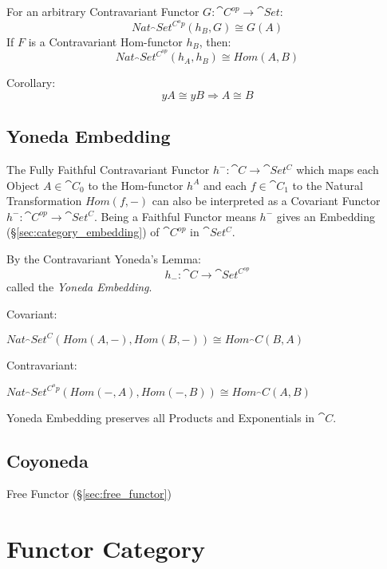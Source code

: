 For an arbitrary Contravariant Functor $G : \cat{C}^{op} \rightarrow
\cat{Set}$:
\[
  Nat_\cat{Set^{C^op}}(h_B,G) \cong G(A)
\]
If $F$ is a Contravariant Hom-functor $h_B$, then:
\[
  Nat_\cat{Set^{C^{op}}}(h_A,h_B) \cong Hom(A,B)
\]

Corollary:
\[
  yA \cong yB \Rightarrow A \cong B
\]



\subsection{Yoneda Embedding}\label{sec:yoneda_embedding}

The Fully Faithful Contravariant Functor $h^- : \cat{C} \rightarrow
\cat{Set^C}$ which maps each Object $A \in \cat{C}_0$ to the
Hom-functor $h^A$ and each $f \in \cat{C}_1$ to the Natural
Transformation $Hom(f,-)$ can also be interpreted as a Covariant
Functor $h^- : \cat{C^{op}} \rightarrow \cat{Set^C}$. Being a
Faithful Functor means $h^-$ gives an Embedding
(\S\ref{sec:category_embedding}) of $\cat{C^{op}}$ in
$\cat{Set^C}$.

By the Contravariant Yoneda's Lemma:
\[
  h_-: \cat{C} \rightarrow \cat{Set^{C^{op}}}
\]
called the \emph{Yoneda Embedding}.

Covariant:

$Nat_\cat{Set^C}(Hom(A,-), Hom(B,-)) \cong Hom_\cat{C}(B,A)$

Contravariant:

$Nat_\cat{Set^{C^op}}(Hom(-,A), Hom(-,B)) \cong Hom_\cat{C}(A,B)$

Yoneda Embedding preserves all Products and Exponentials in
$\cat{C}$.



\subsection{Coyoneda}\label{sec:coyoneda}

Free Functor (\S\ref{sec:free_functor})



\section{Functor Category}\label{sec:functor_category}

